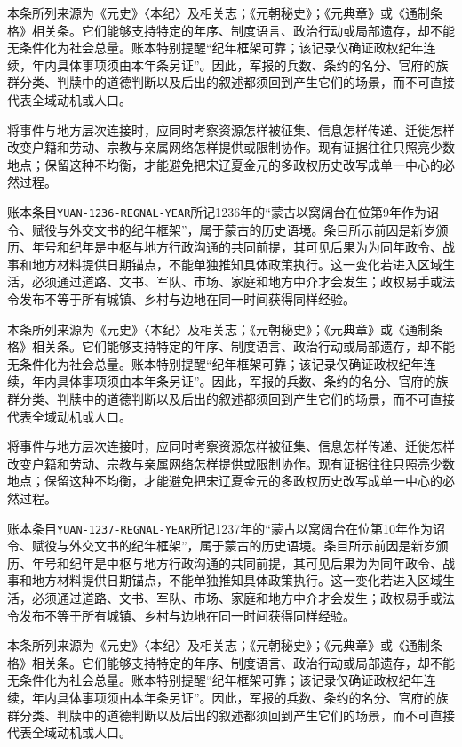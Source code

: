 本条所列来源为《元史》〈本纪〉及相关志；《元朝秘史》；《元典章》或《通制条格》相关条。它们能够支持特定的年序、制度语言、政治行动或局部遗存，却不能无条件化为社会总量。账本特别提醒“纪年框架可靠；该记录仅确证政权纪年连续，年内具体事项须由本年条另证”。因此，军报的兵数、条约的名分、官府的族群分类、判牍中的道德判断以及后出的叙述都须回到产生它们的场景，而不可直接代表全域动机或人口。

将事件与地方层次连接时，应同时考察资源怎样被征集、信息怎样传递、迁徙怎样改变户籍和劳动、宗教与亲属网络怎样提供或限制协作。现有证据往往只照亮少数地点；保留这种不均衡，才能避免把宋辽夏金元的多政权历史改写成单一中心的必然过程。

账本条目\texttt{YUAN-1236-REGNAL-YEAR}所记1236年的“蒙古以窝阔台在位第9年作为诏令、赋役与外交文书的纪年框架”，属于蒙古的历史语境。条目所示前因是新岁颁历、年号和纪年是中枢与地方行政沟通的共同前提，其可见后果为为同年政令、战事和地方材料提供日期锚点，不能单独推知具体政策执行。这一变化若进入区域生活，必须通过道路、文书、军队、市场、家庭和地方中介才会发生；政权易手或法令发布不等于所有城镇、乡村与边地在同一时间获得同样经验。

本条所列来源为《元史》〈本纪〉及相关志；《元朝秘史》；《元典章》或《通制条格》相关条。它们能够支持特定的年序、制度语言、政治行动或局部遗存，却不能无条件化为社会总量。账本特别提醒“纪年框架可靠；该记录仅确证政权纪年连续，年内具体事项须由本年条另证”。因此，军报的兵数、条约的名分、官府的族群分类、判牍中的道德判断以及后出的叙述都须回到产生它们的场景，而不可直接代表全域动机或人口。

将事件与地方层次连接时，应同时考察资源怎样被征集、信息怎样传递、迁徙怎样改变户籍和劳动、宗教与亲属网络怎样提供或限制协作。现有证据往往只照亮少数地点；保留这种不均衡，才能避免把宋辽夏金元的多政权历史改写成单一中心的必然过程。

账本条目\texttt{YUAN-1237-REGNAL-YEAR}所记1237年的“蒙古以窝阔台在位第10年作为诏令、赋役与外交文书的纪年框架”，属于蒙古的历史语境。条目所示前因是新岁颁历、年号和纪年是中枢与地方行政沟通的共同前提，其可见后果为为同年政令、战事和地方材料提供日期锚点，不能单独推知具体政策执行。这一变化若进入区域生活，必须通过道路、文书、军队、市场、家庭和地方中介才会发生；政权易手或法令发布不等于所有城镇、乡村与边地在同一时间获得同样经验。

本条所列来源为《元史》〈本纪〉及相关志；《元朝秘史》；《元典章》或《通制条格》相关条。它们能够支持特定的年序、制度语言、政治行动或局部遗存，却不能无条件化为社会总量。账本特别提醒“纪年框架可靠；该记录仅确证政权纪年连续，年内具体事项须由本年条另证”。因此，军报的兵数、条约的名分、官府的族群分类、判牍中的道德判断以及后出的叙述都须回到产生它们的场景，而不可直接代表全域动机或人口。

